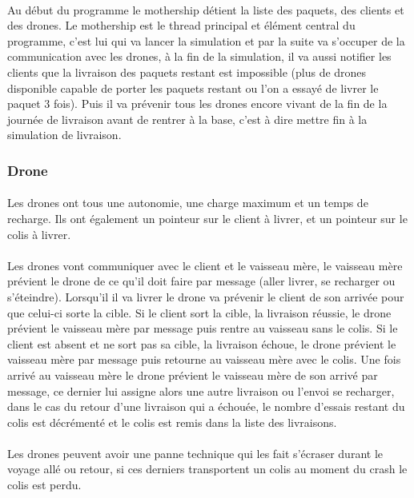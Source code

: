 \documentclass[article, backcover, french, nodocumentinfo]{upmethodology-document}
\begin{document}
				\paragraph*{}
					Au début du programme le mothership détient la liste des paquets, des clients et des drones. Le mothership est le thread principal et élément central du programme, c'est lui qui va lancer la simulation et par la suite va s'occuper de la communication avec les drones, à la fin de la simulation, il va aussi notifier les clients que la livraison des paquets restant est impossible (plus de drones disponible capable de porter les paquets restant ou l'on a essayé de livrer le paquet 3 fois). Puis il va prévenir tous les drones encore vivant de la fin de la journée de livraison avant de rentrer à la base, c'est à dire mettre fin à la simulation de livraison.
			\subsubsection{Drone}
				\paragraph*{}
					Les drones ont tous une autonomie, une charge maximum et un temps de recharge. Ils ont également un pointeur sur le client à livrer, et un pointeur sur le colis à livrer.
				\paragraph*{}
					Les drones vont communiquer avec le client et le vaisseau mère, le vaisseau mère prévient le drone de ce qu'il doit faire par message (aller livrer, se recharger ou s'éteindre). Lorsqu'il il va livrer le drone va prévenir le client de son arrivée pour que celui-ci sorte la cible. Si le client sort la cible, la livraison réussie, le drone prévient le vaisseau mère par message puis rentre au vaisseau sans le colis. Si le client est absent et ne sort pas sa cible, la livraison échoue, le drone prévient le vaisseau mère par message puis retourne au vaisseau mère avec le colis. Une fois arrivé au vaisseau mère le drone prévient le vaisseau mère de son arrivé par message, ce dernier lui assigne alors une autre livraison ou l'envoi se recharger, dans le cas du retour d'une livraison qui a échouée, le nombre d'essais restant du colis est décrémenté et le colis est remis dans la liste des livraisons.
				\paragraph*{}
					Les drones peuvent avoir une panne technique qui les fait s'écraser durant le voyage allé ou retour, si ces derniers transportent un colis au moment du crash le colis est perdu.
\end{document}

